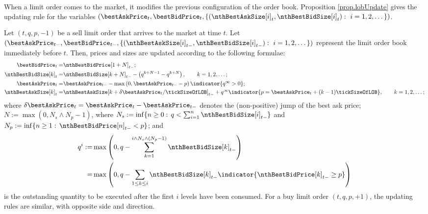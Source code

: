 When a limit order comes to the market, it modifies the previous configuration of the order book.
Proposition \ref{prop.lobUpdate} gives the updating rule for the variables
$(\bestAskPrice_t, \bestBidPrice_t, \lbrace (\nthBestAskSize[i]_t, \nthBestBidSize[i]_t) : \, \, i=1,2,\dots\rbrace)$.
\begin{prop}
\label{prop.lobUpdate}
 Let $(t,q,p,-1)$ be a sell limit order that arrives to the market at time $t$.
 Let $(\bestAskPrice_{t-}, \bestBidPrice_{t-},\lbrace (\nthBestAskSize[i]_{t-}, \nthBestBidSize[i]_{t-}) : \, \, i=1,2,\dots\rbrace )$
 represent the limit order book immediately before $t$.
 Then, prices and sizes are updated according to the following formulae:
 \begin{equation}
 \label{eq.lobUpdateSellOrder}
  \begin{split}
   \bestBidPrice_t =& \nthBestBidPrice[1+N]_{t-};
   \\
   \nthBestBidSize[k]_{t}
   =& \nthBestBidSize[k+N]_{t-}
   - \left( q^{k+N-1}-q^{k+N}\right), \qquad k=1,2,\dots ;
   \\
   \bestAskPrice_t = & \bestAskPrice_{t-}
   - \max\left(0,\bestAskPrice_{t-} - p\right) \indicator{q^{\infty} > 0} ;
   \\
   \nthBestAskSize[k]_t = &  \nthBestAskSize[k+\delta\bestAskPrice_t/\tickSizeOfLOB]_{t-}
   +q^{\infty}\indicator{p=\bestAskPrice_t + (k-1)\tickSizeOfLOB}, \qquad k=1,2,\dots ;
  \end{split}
 \end{equation}
 where $\delta\bestAskPrice_t = \bestAskPrice_t - \bestAskPrice_{t-}$
 denotes the (non-positive) jump of the best ask price;
 $N:=\max(0,N_s \wedge N_p -1)$,
 where $N_s := \inf\lbrace n\geq 0 : \, q<\sum_{i=1}^{n} \nthBestBidSize[i]_{t-}\rbrace$
 and $N_p:=\inf\lbrace n\geq 1: \, \nthBestBidPrice[n]_{t-}< p \rbrace$; and
 \begin{equation*}
  \begin{split}
   q^{i}:=& \max\left( 0,
    q-\sum_{k=1}^{i\wedge N_s \wedge (N_p - 1)} \nthBestBidSize[k]_{t-}
   \right)
   \\
   =& \max\left( 0,
   q-\sum_{1 \leq k\leq i} \nthBestBidSize[k]_{t-}\indicator{\nthBestBidPrice[k]_{t-} \geq p}
   \right)
  \end{split}
 \end{equation*}
 is the outstanding quantity to be executed after the first $i$ levels have been consumed.
 For a buy limit order $(t,q,p,+1)$, the updating rules are similar, with opposite side and direction.
\end{prop}
